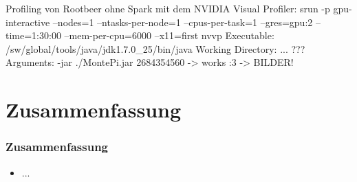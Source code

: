 \begin{frame}
\end{frame}


\begin{frame}
Profiling von Rootbeer ohne Spark mit dem NVIDIA Visual Profiler:
    srun -p gpu-interactive --nodes=1 --ntasks-per-node=1 --cpus-per-task=1 --gres=gpu:2 --time=1:30:00 --mem-per-cpu=6000 --x11=first nvvp
    Executable: /sw/global/tools/java/jdk1.7.0_25/bin/java
    Working Directory: ... ???
    Arguments: -jar ./MontePi.jar 2684354560
       -> works :3
 -> BILDER!
\end{frame}



\section{Zusammenfassung}
\begin{frame}
	\frametitle{Zusammenfassung}
	\begin{itemize}
		\item ...
	\end{itemize}
\end{frame}



